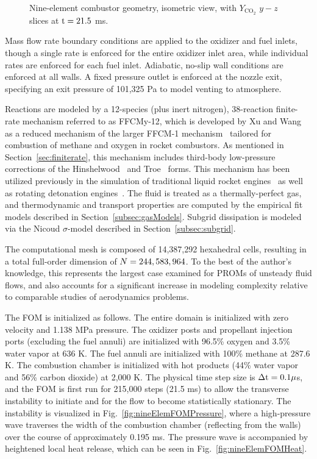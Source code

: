 \begin{figure}
\begin{minipage}{0.49\linewidth}
		\fi
		\caption{\label{fig:nineElemGeomIso}Nine-element combustor geometry, isometric view, with $Y_{\text{CO}_2}$ $y-z$ slices at $\text{t} = 21.5$ ms.}
	\end{minipage}
\end{figure}

Mass flow rate boundary conditions are applied to the oxidizer and fuel inlets, though a single rate is enforced for the entire oxidizer inlet area, while individual rates are enforced for each fuel inlet. Adiabatic, no-slip wall conditions are enforced at all walls. A fixed pressure outlet is enforced at the nozzle exit, specifying an exit pressure of 101,325 Pa to model venting to atmosphere.

Reactions are modeled by a 12-species (plus inert nitrogen), 38-reaction finite-rate mechanism referred to as FFCMy-12, which is developed by Xu and Wang~\cite{Wang2018,Xu2018} as a reduced mechanism of the larger FFCM-1 mechanism~\cite{ffcm1} tailored for combustion of methane and oxygen in rocket combustors. As mentioned in Section~\ref{sec:finiterate}, this mechanism includes third-body low-pressure corrections of the Hinshelwood~\cite{Hinshelwood1926} and Troe~\cite{Gilbert1983} forms. This mechanism has been utilized previously in the simulation of traditional liquid rocket engines~\cite{Harvazinski2020,Harvazinski2021} as well as rotating detonation engines~\cite{Prakash2021,Batista2021}. The fluid is treated as a thermally-perfect gas, and thermodynamic and transport properties are computed by the empirical fit models described in Section~\ref{subsec:gasModels}. Subgrid dissipation is modeled via the Nicoud $\sigma$-model described in Section~\ref{subsec:subgrid}.

The computational mesh is composed of 14,387,292 hexahedral cells, resulting in a total full-order dimension of $N = 244,583,964$. To the best of the author's knowledge, this represents the largest case examined for PROMs of unsteady fluid flows, and also accounts for a significant increase in modeling complexity relative to comparable studies of aerodynamics problems.

The FOM is initialized as follows. The entire domain is initialized with zero velocity and 1.138 MPa pressure. The oxidizer posts and propellant injection ports (excluding the fuel annuli) are initialized with 96.5\% oxygen and 3.5\% water vapor at 636 K. The fuel annuli are initialized with 100\% methane at 287.6 K. The combustion chamber is initialized with hot products (44\% water vapor and 56\% carbon dioxide) at 2,000 K. The physical time step size is $\Delta \text{t} = 0.1 \mu$s, and the FOM is first run for 215,000 steps (21.5 ms) to allow the transverse instability to initiate and for the flow to become statistically stationary. The instability is visualized in Fig.~\ref{fig:nineElemFOMPressure}, where a high-pressure wave traverses the width of the combustion chamber (reflecting from the walls) over the course of approximately 0.195 ms. The pressure wave is accompanied by heightened local heat release, which can be seen in Fig.~\ref{fig:nineElemFOMHeat}.

